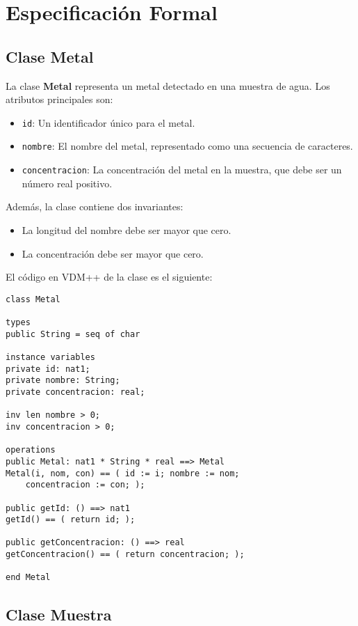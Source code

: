 \section{Especificación Formal}

\subsection{Clase Metal}

La clase \textbf{Metal} representa un metal detectado en una muestra de agua. Los atributos principales son:

\begin{itemize}
    \item \texttt{id}: Un identificador único para el metal.
    \item \texttt{nombre}: El nombre del metal, representado como una secuencia de caracteres.
    \item \texttt{concentracion}: La concentración del metal en la muestra, que debe ser un número real positivo.
\end{itemize}

Además, la clase contiene dos invariantes:

\begin{itemize}
    \item La longitud del nombre debe ser mayor que cero.
    \item La concentración debe ser mayor que cero.
\end{itemize}

El código en VDM++ de la clase es el siguiente:

\begin{lstlisting}
class Metal

types
public String = seq of char

instance variables
private id: nat1;
private nombre: String;
private concentracion: real;

inv len nombre > 0;
inv concentracion > 0;

operations
public Metal: nat1 * String * real ==> Metal
Metal(i, nom, con) == ( id := i; nombre := nom;
	concentracion := con; );

public getId: () ==> nat1
getId() == ( return id; );

public getConcentracion: () ==> real
getConcentracion() == ( return concentracion; );

end Metal
\end{lstlisting}

\subsection{Clase Muestra}

